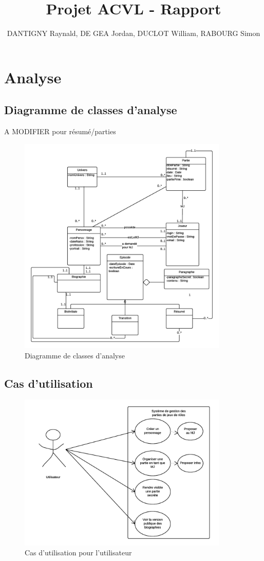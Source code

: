 \documentclass[a4paper,oneside,10pt]{article}
\title{Projet ACVL - Rapport}
\author{DANTIGNY Raynald, DE GEA Jordan, DUCLOT William, RABOURG Simon}
\begin{document}
\maketitle

\section{Analyse}
\subsection{Diagramme de classes d'analyse}
A MODIFIER pour résumé/parties
\begin{figure}[H]
\begin{center}
\includegraphics[width=10cm]{images/classe/DiagrammeClasse.png} 
	\caption{Diagramme de classes d'analyse}
\end{center}
\end{figure}
\subsection{Cas d'utilisation}
\begin{figure}[H]
	\begin{center}
\includegraphics[width=10cm]{images/utilisation/UserCU.png} 
	\caption{Cas d'utilisation pour l'utilisateur}
\end{center}
\end{figure}
\end{document}
